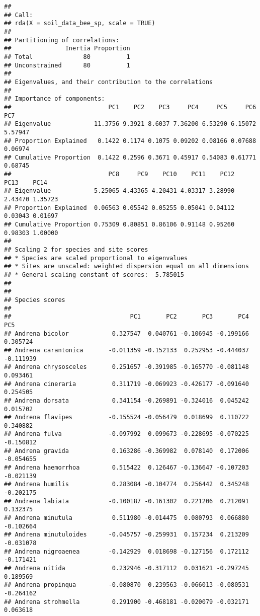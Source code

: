 \documentclass[
]{article}
\begin{document}
\begin{verbatim}
## 
## Call:
## rda(X = soil_data_bee_sp, scale = TRUE) 
## 
## Partitioning of correlations:
##               Inertia Proportion
## Total              80          1
## Unconstrained      80          1
## 
## Eigenvalues, and their contribution to the correlations 
## 
## Importance of components:
##                           PC1    PC2    PC3     PC4     PC5     PC6     PC7
## Eigenvalue            11.3756 9.3921 8.6037 7.36200 6.53290 6.15072 5.57947
## Proportion Explained   0.1422 0.1174 0.1075 0.09202 0.08166 0.07688 0.06974
## Cumulative Proportion  0.1422 0.2596 0.3671 0.45917 0.54083 0.61771 0.68745
##                           PC8     PC9    PC10    PC11    PC12    PC13    PC14
## Eigenvalue            5.25065 4.43365 4.20431 4.03317 3.28990 2.43470 1.35723
## Proportion Explained  0.06563 0.05542 0.05255 0.05041 0.04112 0.03043 0.01697
## Cumulative Proportion 0.75309 0.80851 0.86106 0.91148 0.95260 0.98303 1.00000
## 
## Scaling 2 for species and site scores
## * Species are scaled proportional to eigenvalues
## * Sites are unscaled: weighted dispersion equal on all dimensions
## * General scaling constant of scores:  5.785015 
## 
## 
## Species scores
## 
##                                 PC1       PC2       PC3       PC4       PC5
## Andrena bicolor            0.327547  0.040761 -0.106945 -0.199166  0.305724
## Andrena carantonica       -0.011359 -0.152133  0.252953 -0.444037 -0.111939
## Andrena chrysosceles       0.251657 -0.391985 -0.165770 -0.081148  0.093461
## Andrena cineraria          0.311719 -0.069923 -0.426177 -0.091640  0.254505
## Andrena dorsata            0.341154 -0.269891 -0.324016  0.045242  0.015702
## Andrena flavipes          -0.155524 -0.056479  0.018699  0.110722  0.340882
## Andrena fulva             -0.097992  0.099673 -0.228695 -0.070225 -0.150812
## Andrena gravida            0.163286 -0.369982  0.078140  0.172006 -0.054655
## Andrena haemorrhoa         0.515422  0.126467 -0.136647 -0.107203 -0.021139
## Andrena humilis            0.283084 -0.104774  0.256442  0.345248 -0.202175
## Andrena labiata           -0.100187 -0.161302  0.221206  0.212091  0.132375
## Andrena minutula           0.511980 -0.014475  0.080793  0.066880 -0.102664
## Andrena minutuloides      -0.045757 -0.259931  0.157234  0.213209 -0.031078
## Andrena nigroaenea        -0.142929  0.018698 -0.127156  0.172112 -0.171421
## Andrena nitida             0.232946 -0.317112  0.031621 -0.297245  0.189569
## Andrena propinqua         -0.080870  0.239563 -0.066013 -0.080531 -0.264162
## Andrena strohmella         0.291900 -0.468181 -0.020079 -0.032171  0.063618

\end{verbatim}
\end{document}
